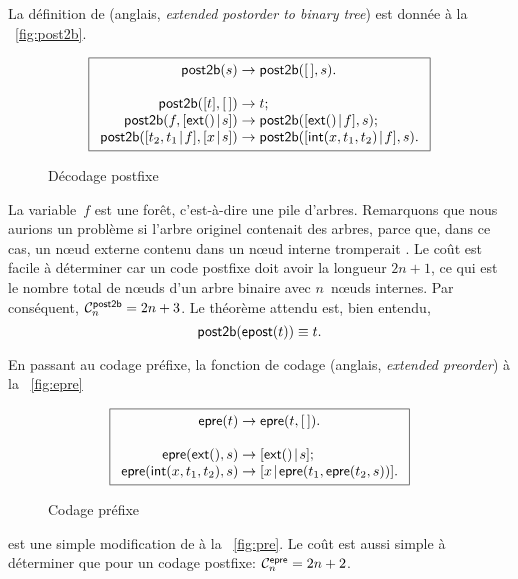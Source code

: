 La définition de 
(anglais, \emph{extended postorder to binary tree}) est donnée à la
\fig~\vref{fig:post2b}.
\begin{figure}
\begin{equation*}
\boxed{
\begin{array}{r@{\;}c@{\;}l}
\fun{post2b}(s) & \rightarrow & \fun{post2b}(\el,s).\\
\\
\fun{post2b}([t],\el) & \rightarrow & t;\\
\fun{post2b}(f,\cons{\fun{ext}()}{s}) & \rightarrow & \fun{post2b}(\cons{\fun{ext}()}{f},s);\\
\fun{post2b}(\cons{t_2,t_1}{f},\cons{x}{s}) & \rightarrow & \fun{post2b}(\cons{\fun{int}(x,t_1,t_2)}{f},s).
\end{array}}
\end{equation*}
\caption{Décodage postfixe\label{fig:post2b}}
\end{figure}
La variable~\(f\) est une forêt, c'est-à-dire une
pile d'arbres. Remarquons que nous aurions un problème si l'arbre
originel contenait des arbres, parce que, dans ce cas, un n{\oe}ud
externe contenu dans un n{\oe}ud interne tromperait
. Le coût est facile à
déterminer car un code postfixe doit avoir la longueur \(2n+1\), ce
qui est le nombre total de n{\oe}uds d'un arbre binaire avec
\(n\)~n{\oe}uds internes. Par conséquent, \(\C{\fun{post2b}}{n} = 2n +
3\). Le théorème attendu est, bien
entendu,
\begin{equation}
\fun{post2b}(\fun{epost}(t)) \equiv t.
\label{thm_post2b_epost}
\end{equation}

En passant au codage préfixe, la fonction de codage
(anglais, \emph{extended preorder}) à la \fig~\vref{fig:epre}
\begin{figure}[b]
\begin{equation*}
\boxed{
\begin{array}{r@{\;}c@{\;}l}
\fun{epre}(t) & \rightarrow & \fun{epre}(t,\el).\\
\\
\fun{epre}(\fun{ext}(),s) & \rightarrow
  & \cons{\fun{ext}()}{s};\\
\fun{epre}(\fun{int}(x,t_1,t_2),s) & \rightarrow
  & \cons{x}{\fun{epre}(t_1,\fun{epre}(t_2,s))}.
\end{array}}
\end{equation*}
\caption{Codage préfixe\label{fig:epre}}
\end{figure}
est une simple modification de  à la
\fig~\vref{fig:pre}. Le coût est aussi simple à déterminer que pour un
codage postfixe: \(\C{\fun{epre}}{n} =
2n+2\).

